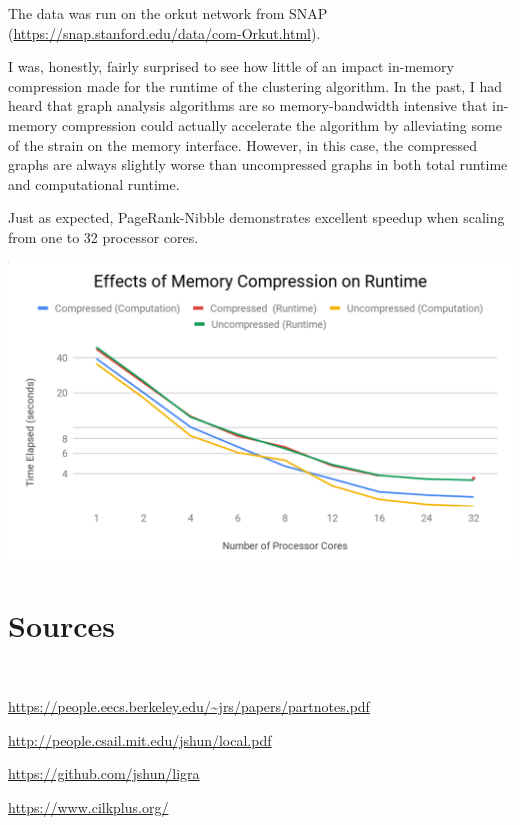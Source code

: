 The data was run on the orkut network from SNAP
(\url{https://snap.stanford.edu/data/com-Orkut.html}).

I was, honestly, fairly surprised to see how little of
an impact in-memory compression made for the runtime of the clustering
algorithm. In the past, I had heard that graph analysis algorithms are
so memory-bandwidth intensive that in-memory compression could actually
accelerate the algorithm by alleviating some of the strain on the memory
interface. However, in this case, the compressed graphs are always
slightly worse than uncompressed graphs in both total runtime and
computational runtime.

Just as expected, PageRank-Nibble demonstrates excellent speedup when
scaling from one to 32 processor cores.

\begin{center}
	\includegraphics[width=0.75\linewidth]{../data/graph.png}
\end{center}


\section{Sources} $\ $

\url{https://people.eecs.berkeley.edu/~jrs/papers/partnotes.pdf}

\url{http://people.csail.mit.edu/jshun/local.pdf}

\url{https://github.com/jshun/ligra}

\url{https://www.cilkplus.org/}


